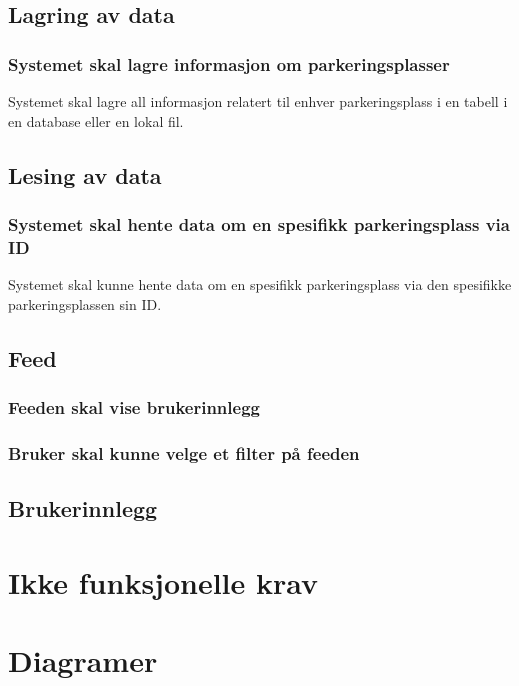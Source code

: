 \documentclass[12pt]{article}
\begin{document}
\subsection{Lagring av data}

\subsubsection{Systemet skal lagre informasjon om parkeringsplasser}
Systemet skal lagre all informasjon relatert til enhver parkeringsplass i en tabell i en database eller en lokal fil.

\subsection{Lesing av data}

\subsubsection{Systemet skal hente data om en spesifikk parkeringsplass via ID}
Systemet skal kunne hente data om en spesifikk parkeringsplass via den spesifikke parkeringsplassen sin ID.

\subsection{Feed}

\subsubsection{Feeden skal vise brukerinnlegg}

\subsubsection{Bruker skal kunne velge et filter på feeden}

\subsection{Brukerinnlegg}

\section{Ikke funksjonelle krav}


\section{Diagramer}
\end{document}
